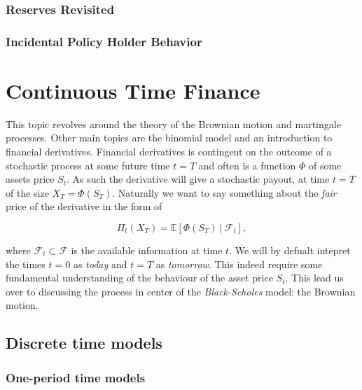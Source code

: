 \documentclass[
]{book}
\begin{document}
\hypertarget{reserves-revisited-1}{%
\subsection{Reserves Revisited}\label{reserves-revisited-1}}

\hypertarget{incidental-policy-holder-behavior}{%
\subsection{Incidental Policy Holder Behavior}\label{incidental-policy-holder-behavior}}

\hypertarget{continuous-time-finance}{%
\chapter{Continuous Time Finance}\label{continuous-time-finance}}

This topic revolves around the theory of the Brownian motion and martingale processes. Other main topics are the binomial model and an introduction to financial derivatives. Financial derivatives is contingent on the outcome of a stochastic process at some future time \(t=T\) and often is a function \(\Phi\) of some assets price \(S_t\). As such the derivative will give a stochastic payout, at time \(t=T\) of the size \(X_T=\Phi(S_T)\). Naturally we want to say something about the \emph{fair} price of the derivative in the form of

\[\Pi_t(X_T)=\mathbb{E}\left[\Phi(S_T)\ \vert\ \mathcal{F}_t\right],\]

where \(\mathcal{F}_t\subset\mathcal{F}\) is the available information at time \(t\). We will by defualt intepret the times \(t=0\) as \emph{today} and \(t=T\) as \emph{tomorrow}. This indeed require some fundamental understanding of the behaviour of the asset price \(S_t\). This lead us over to discussing the process in center of the \emph{Black-Scholes} model: the Brownian motion.

\hypertarget{discrete-time-models}{%
\section{Discrete time models}\label{discrete-time-models}}

\hypertarget{one-period-time-models}{%
\subsection{One-period time models}\label{one-period-time-models}}
\end{document}
